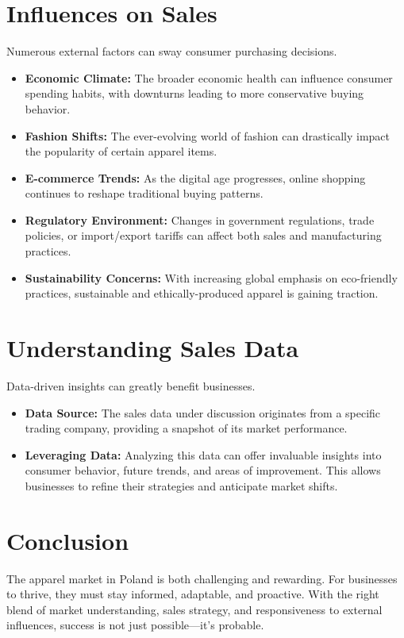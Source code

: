 \documentclass{article}
\begin{document}
\section{Influences on Sales}
Numerous external factors can sway consumer purchasing decisions.
\begin{itemize}
    \item \textbf{Economic Climate:} The broader economic health can influence consumer spending habits, with downturns leading to more conservative buying behavior.
    \item \textbf{Fashion Shifts:} The ever-evolving world of fashion can drastically impact the popularity of certain apparel items.
    \item \textbf{E-commerce Trends:} As the digital age progresses, online shopping continues to reshape traditional buying patterns.
    \item \textbf{Regulatory Environment:} Changes in government regulations, trade policies, or import/export tariffs can affect both sales and manufacturing practices.
    \item \textbf{Sustainability Concerns:} With increasing global emphasis on eco-friendly practices, sustainable and ethically-produced apparel is gaining traction.
\end{itemize}

\section{Understanding Sales Data}
Data-driven insights can greatly benefit businesses.
\begin{itemize}
    \item \textbf{Data Source:} The sales data under discussion originates from a specific trading company, providing a snapshot of its market performance.
    \item \textbf{Leveraging Data:} Analyzing this data can offer invaluable insights into consumer behavior, future trends, and areas of improvement. This allows businesses to refine their strategies and anticipate market shifts.
\end{itemize}

\section{Conclusion}
The apparel market in Poland is both challenging and rewarding. For businesses to thrive, they must stay informed, adaptable, and proactive. With the right blend of market understanding, sales strategy, and responsiveness to external influences, success is not just possible—it's probable.
\end{document}
